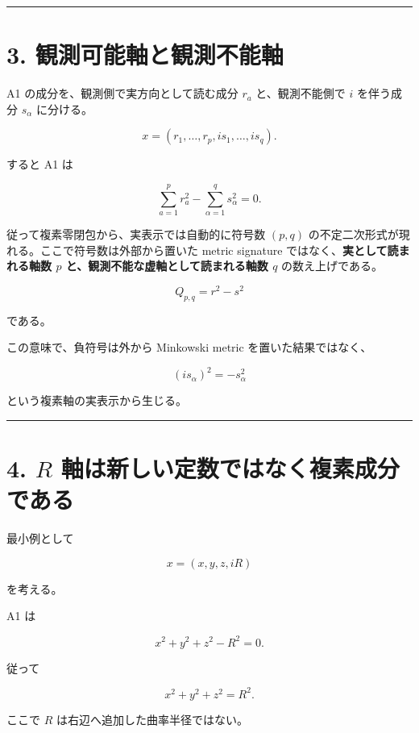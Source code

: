 \documentclass[
  a4paper,
]{ltjsarticle}
\begin{document}
\begin{center}\rule{0.5\linewidth}{0.5pt}\end{center}

\section{3.
観測可能軸と観測不能軸}\label{ux89b3ux6e2cux53efux80fdux8ef8ux3068ux89b3ux6e2cux4e0dux80fdux8ef8}

A1 の成分を、観測側で実方向として読む成分 \(r_a\) と、観測不能側で \(i\)
を伴う成分 \(s_\alpha\) に分ける。

\[
x=
(r_1,\ldots,r_p,
is_1,\ldots,is_q).
\]

すると A1 は

\[
\sum_{a=1}^{p}r_a^2
-
\sum_{\alpha=1}^{q}s_\alpha^2
=0.
\]

従って複素零閉包から、実表示では自動的に符号数 \((p,q)\)
の不定二次形式が現れる。ここで符号数は外部から置いた metric signature
ではなく、\textbf{実として読まれる軸数 \(p\)
と、観測不能な虚軸として読まれる軸数 \(q\)} の数え上げである。

\[
\boxed{
Q_{p,q}
=
r^2-s^2
}
\]

である。

この意味で、負符号は外から Minkowski metric を置いた結果ではなく、

\[
\boxed{
(i s_\alpha)^2=-s_\alpha^2
}
\]

という複素軸の実表示から生じる。

\begin{center}\rule{0.5\linewidth}{0.5pt}\end{center}

\section{\texorpdfstring{4. \(R\)
軸は新しい定数ではなく複素成分である}{4. R 軸は新しい定数ではなく複素成分である}}\label{r-ux8ef8ux306fux65b0ux3057ux3044ux5b9aux6570ux3067ux306fux306aux304fux8907ux7d20ux6210ux5206ux3067ux3042ux308b}

最小例として

\[
x=(x,y,z,iR)
\]

を考える。

A1 は

\[
x^2+y^2+z^2-R^2=0.
\]

従って

\[
\boxed{
x^2+y^2+z^2=R^2
}.
\]

ここで \(R\) は右辺へ追加した曲率半径ではない。
\end{document}
